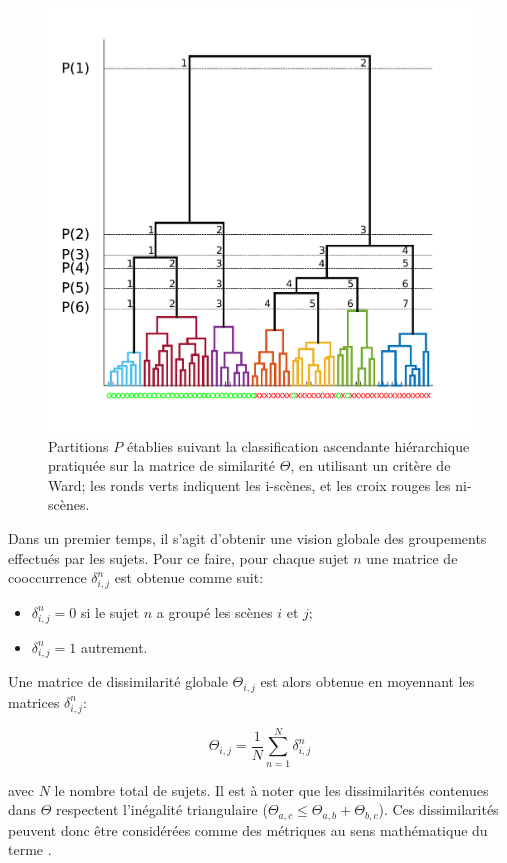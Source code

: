\begin{figure}[t]
        \myfloatalign
        \includegraphics[width=.8\linewidth]{gfx/ch_5/dendrogram}
        \caption[Partitions $P$ établies suivant la classification ascendante hiérarchique.]{Partitions $P$ établies suivant la classification ascendante hiérarchique pratiquée sur la matrice de similarité $\Theta$, en utilisant un critère de Ward; les ronds verts indiquent les i-scènes, et les croix rouges les ni-scènes.}\label{fig:dendrogram}
\end{figure}

Dans un premier temps, il s'agit d'obtenir une vision globale des groupements effectués par les sujets. Pour ce faire, pour chaque sujet $n$ une matrice de cooccurrence $\delta^n_{i,j}$ est obtenue comme suit:

\begin{itemize}
\item $\delta^n_{i,j}=0$ si le sujet $n$ a groupé les scènes $i$ et $j$;
\item $\delta^n_{i,j}=1$ autrement.
\end{itemize}

Une matrice de dissimilarité globale $\Theta_{i,j}$ est alors obtenue en moyennant les matrices $\delta^n_{i,j}$:

\begin{equation}
\Theta_{i,j}= \dfrac{1}{N} \sum_{n=1}^{N}  \delta^n_{i,j}
\end{equation}

avec $N$ le nombre total de sujets. Il est à noter que les dissimilarités contenues dans $\Theta$ respectent l'inégalité triangulaire ($\Theta_{a,c}\leq\Theta_{a,b}+\Theta_{b,c}$). Ces dissimilarités peuvent donc être considérées comme des métriques au sens mathématique du terme \citep{parizet2012application}. 

